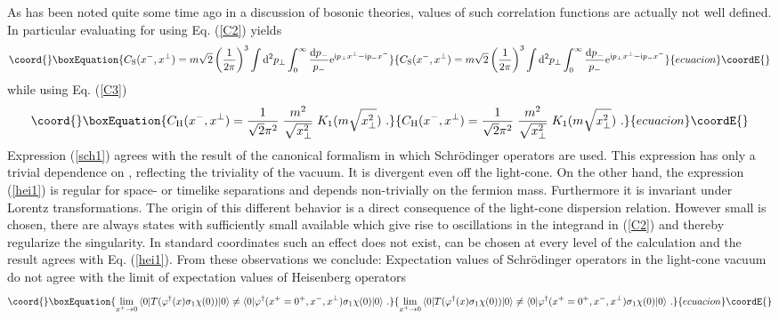 \documentclass[a4paper,12pt]{article}
\begin{document}
As has been noted quite some time ago \cite{Nakanishi77} in a discussion of bosonic theories,
values of such correlation functions are actually not well defined. In particular  evaluating
\coordHE{} for \coordHE{}  using  Eq. (\ref{C2}) yields
\begin{equation}\coord{}\boxEquation{
  \label{sch1}
C_{\rm S}(x^{-},x^{\perp})=  m\sqrt{2}  \left ( \frac{1}{2\pi}
    \right )^{3} \int {\rm d}^{2} p_{\perp} \int^{\infty}_{0} \frac{{\rm d}p_{-}}{p_{-}}
{\rm  e}^{{\rm i} p_{\perp}x^{\perp} - {\rm i} p_{-}x^{-} }
}{
  C_{\rm S}(x^{-},x^{\perp})=  m\sqrt{2}  \left ( \frac{1}{2\pi}
    \right )^{3} \int {\rm d}^{2} p_{\perp} \int^{\infty}_{0} \frac{{\rm d}p_{-}}{p_{-}}
{\rm  e}^{{\rm i} p_{\perp}x^{\perp} - {\rm i} p_{-}x^{-} }
}{ecuacion}\coordE{}\end{equation}
while using Eq. (\ref{C3})
\begin{equation}\coord{}\boxEquation{
  \label{hei1}
C_{\rm H}(x^{-},x^{\perp}) =\frac{1}{\sqrt{2} \pi ^{2}} \; \frac{m^{2}}
     {\sqrt{ x_{\perp}^{2} }} \; K_{1} (m\sqrt{x_{\perp}
^{2}})\ .
}{
  C_{\rm H}(x^{-},x^{\perp}) =\frac{1}{\sqrt{2} \pi ^{2}} \; \frac{m^{2}}
     {\sqrt{ x_{\perp}^{2} }} \; K_{1} (m\sqrt{x_{\perp}
^{2}})\ .
}{ecuacion}\coordE{}\end{equation}
Expression (\ref{sch1}) agrees with the result of the canonical formalism in which Schr\"odinger
operators are used.  This expression has only a trivial dependence on \coordHE{}, reflecting the triviality
of the vacuum. It is divergent even off the light-cone. On the other hand, the expression (\ref{hei1})
is regular for space- or timelike separations and depends non-trivially on the fermion mass. Furthermore
it is invariant under Lorentz transformations. The origin of this different behavior is a direct
consequence of the
light-cone dispersion relation. However small \coordHE{} is chosen, there are always
states with sufficiently small \coordHE{} available which give rise to oscillations in the
integrand in  (\ref{C2}) and thereby regularize the \coordHE{} singularity. In standard
coordinates such an effect does not exist, \coordHE{} can be chosen at every level
of the calculation and the result agrees with Eq. (\ref{hei1}).
From these observations we conclude: Expectation values of Schr\"odinger operators in the
light-cone vacuum do not agree with the limit of  expectation values of Heisenberg operators
\begin{equation}\coord{}\boxEquation{
\label{schei}
\lim_{x^{+}\rightarrow 0}\, \langle 0|T (\varphi ^{\dagger}(x)\sigma_{1} \chi(0) ) | 0 \rangle \neq
\langle 0 | \varphi ^{\dagger} (x^{+} = 0^{+}, x^{-}, x^{\perp} )\sigma_{1} \chi(0)  | 0 \rangle \ .
}{
\lim_{x^{+}\rightarrow 0}\, \langle 0|T (\varphi ^{\dagger}(x)\sigma_{1} \chi(0) ) | 0 \rangle \neq
\langle 0 | \varphi ^{\dagger} (x^{+} = 0^{+}, x^{-}, x^{\perp} )\sigma_{1} \chi(0)  | 0 \rangle \ .
}{ecuacion}\coordE{}\end{equation}
\end{document}
